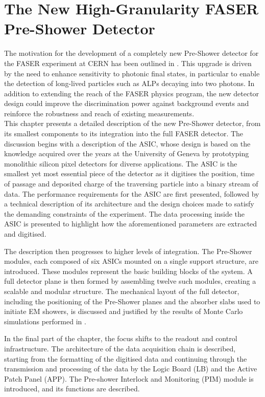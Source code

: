 \chapter{The New High-Granularity FASER Pre-Shower Detector}

The motivation for the development of a completely new Pre-Shower detector for the FASER experiment at CERN has been outlined in . This upgrade is driven by the need to enhance sensitivity to photonic final states, in particular to enable the detection of long-lived particles such as ALPs decaying into two photons. In addition to extending the reach of the FASER physics program, the new detector design could improve the discrimination power against background events and reinforce the robustness and reach of existing measurements. \\

This chapter presents a detailed description of the new Pre-Shower detector, from its smallest components to its integration into the full FASER detector. The discussion begins with a description of the ASIC, whose design is based on the knowledge acquired over the years at the University of Geneva by prototyping monolithic silicon pixel detectors for diverse applications. The ASIC is the smallest yet most essential piece of the detector as it digitises the position, time of passage and deposited charge of the traversing particle into a binary stream of data. The performance requirements for the ASIC are first presented, followed by a technical description of its architecture and the design choices made to satisfy the demanding constraints of the experiment. The data processing inside the ASIC is presented to highlight how the aforementioned parameters are extracted and digitised.  

The description then progresses to higher levels of integration. The Pre-Shower modules, each composed of six ASICs mounted on a single support structure, are introduced. These modules represent the basic building blocks of the system. A full detector plane is then formed by assembling twelve such modules, creating a scalable and modular structure. The mechanical layout of the full detector, including the positioning of the Pre-Shower planes and the absorber slabs used to initiate EM showers, is discussed and justified by the results of Monte Carlo simulations performed in  .

In the final part of the chapter, the focus shifts to the readout and control infrastructure. The architecture of the data acquisition chain is described, starting from the formatting of the digitised data and continuing through the transmission and processing of the data by the Logic Board (LB) and the Active Patch Panel (APP). The Pre-shower Interlock and Monitoring (PIM) module is introduced, and its functions are described.

